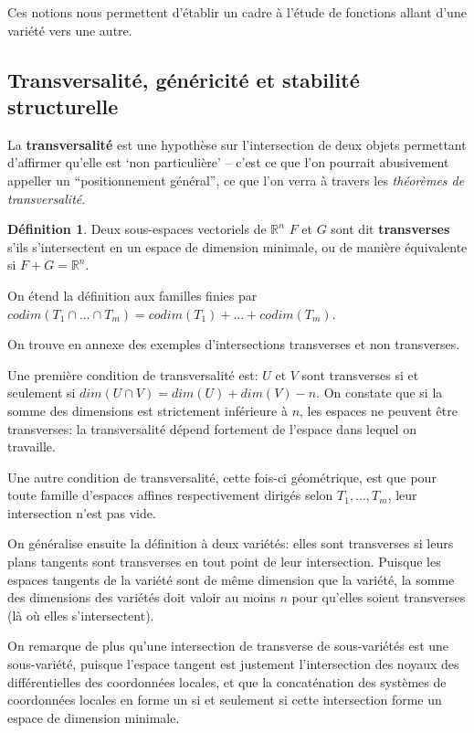 \documentclass{article}
\newcommand{\R}{\mathbb{R}}
\theoremstyle{definition}
\newtheorem{defn}{Définition}
\begin{document}
Ces notions nous permettent d'établir un cadre à l'étude de fonctions allant d'une variété vers une autre.

\subsection{Transversalité, généricité et stabilité structurelle}

La \textbf{transversalité} est une hypothèse sur l'intersection de deux objets permettant d'affirmer qu'elle est `non particulière' -- c'est ce que l'on pourrait abusivement appeller un ``positionnement général'', ce que l'on verra à travers les \textit{théorèmes de transversalité}.

\begin{defn}
	Deux sous-espaces vectoriels de $\R^n$ $F$ et $G$ sont dit \textbf{transverses} s'ils s'intersectent en un espace de dimension minimale, ou de manière équivalente si $F+G=\R^n$.

	On étend la définition aux familles finies par $codim(T_1\cap...\cap T_m)=codim(T_1)+...+codim(T_m)$.
\end{defn}

On trouve en annexe des exemples d'intersections transverses et non transverses.

Une première condition de transversalité est: $U$ et $V$ sont transverses si et seulement si $dim(U\cap V)=dim(U)+dim(V)-n$.
On constate que si la somme des dimensions est strictement inférieure à $n$, les espaces ne peuvent être transverses: la transversalité dépend fortement de l'espace dans lequel on travaille.

Une autre condition de transversalité, cette fois-ci géométrique, est que pour toute famille d'espaces affines respectivement dirigés selon $T_1,...,T_m$, leur intersection n'est pas vide.

On généralise ensuite la définition à deux variétés: elles sont transverses si leurs plans tangents sont transverses en tout point de leur intersection.
Puisque les espaces tangents de la variété sont de même dimension que la variété, la somme des dimensions des variétés doit valoir au moins $n$ pour qu'elles soient transverses (là où elles s'intersectent).

On remarque de plus qu'une intersection de transverse de sous-variétés est une sous-variété, puisque l'espace tangent est justement l'intersection des noyaux des différentielles des coordonnées locales, et que la concaténation des systèmes de coordonnées locales en forme un si et seulement si cette intersection forme un espace de dimension minimale.
\end{document}

